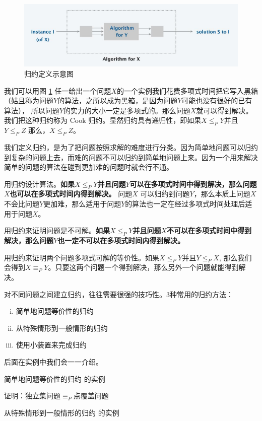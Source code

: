\documentclass[]{article}
\begin{document}
\begin{figure}[htbp]
	\centering
	\includegraphics[width=1\linewidth]{picture/01}
	\caption{归约定义示意图}
	\label{fig:1}
\end{figure}
我们可以用图 \ref{fig:1} 任一给出一个问题$X$的一个实例我们花费多项式时间把它写入黑箱（姑且称为问题$Y$的算法，之所以成为黑箱，是因为问题$Y$可能也没有很好的已有算法），
所以问题$Y$的实力的大小一定是多项式的。那么问题$X$就可以得到解决。我们把这种归约称为 Cook 归约。显然归约具有递归性，即如果$ X \leq_P Y $并且$ Y \leq_P Z $ 那么，$ X \leq_P Z $。

我们定义归约，是为了把问题按照求解的难度进行分类。因为简单地问题可以归约到复杂的问题上去，而难的问题不可以归约到简单地问题上来。因为一个用来解决简单的问题的算法在碰到更加难的问题时就会行不通。

用归约设计算法。\textbf{如果$ X \leq_P Y $并且问题$Y$可以在多项式时间中得到解决，那么问题$X$也可以在多项式时间内得到解决。} 问题$X$ 可以归约到问题$Y$，那么本质上问题$X$不会比问题$Y$更加难，那么适用于问题$Y$的算法也一定在经过多项式时间处理后适用于问题$X$。

用归约来证明问题是不可解。\textbf{如果$ X \leq_P Y $并且问题$X$不可以在多项式时间中得到解决，那么问题$Y$也一定不可以在多项式时间内得到解决。}

用归约来证明两个问题多项式可解的等价性。如果$ X \leq_P Y $并且$ Y \leq_P X $, 那么我们会得到$ X \equiv_P Y $。只要这两个问题一个得到解决，那么另外一个问题就能得到解决。

对不同问题之间建立归约，往往需要很强的技巧性。3种常用的归约方法：
\begin{enumerate}[i.]
	\item 简单地问题等价性的归约
	\item 从特殊情形到一般情形的归约
	\item 使用小装置来完成归约
\end{enumerate}
后面在实例中我们会一一介绍。

简单地问题等价性的归约 的实例

证明：独立集问题$ \equiv_P $点覆盖问题

从特殊情形到一般情形的归约 的实例
\end{document}
